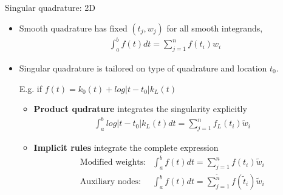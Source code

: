 \documentclass[t]{beamer}
\newcommand{\hg}{\vspace{0.5ex}}
\begin{document}
\begin{noframe}{Singular quadrature: 2D}
  \begin{itemize}
  \item Smooth quadrature has fixed  $(t_j, w_j)$ for all
    smooth integrands,
    \begin{align}
      \int_a^b f(t) dt = \sum_{j=1}^n f(t_i) w_i
    \end{align}
  \item Singular quadrature is tailored on type of quadrature and
    location $t_0$.

    \hg
    E.g. if $f(t) = k_0(t) + log|t-t_0| k_L(t)$
    \begin{itemize}
    \item \textbf{Product qudrature} integrates the singularity explicitly
      \begin{align}
        \int_a^b log|t-t_0| k_L(t) dt = \sum_{j=1}^{n} f_L(t_i) \tilde w_i
      \end{align}

    \item \textbf{Implicit rules} integrate the complete expression
      \begin{align}
        \text{Modified weights:} &       \int_a^b f(t) dt = \sum_{j=1}^n f(t_i) \tilde w_i \\
        \text{Auxiliary nodes:} &       \int_a^b f(t) dt = \sum_{j=1}^{\tilde{n}} f(\tilde t_i) \tilde w_i \\
      \end{align}
    \end{itemize}

  \end{itemize}
  
\end{noframe}
\end{document}

